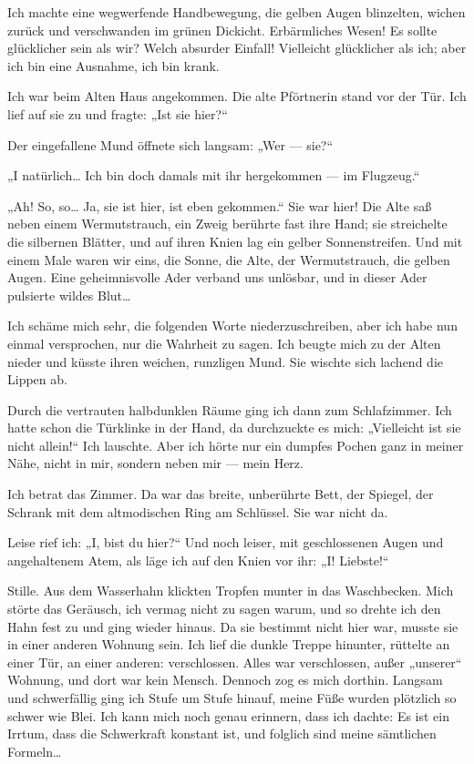 Ich machte eine wegwerfende Handbewegung, die gelben Augen
blinzelten, wichen zurück und verschwanden im grünen Dickicht.
Erbärmliches Wesen! Es sollte glücklicher sein als wir? Welch
absurder Einfall! Vielleicht glücklicher als ich; aber ich bin eine
Ausnahme, ich bin krank.

Ich war beim Alten Haus angekommen. Die
alte Pförtnerin stand vor der Tür. Ich lief auf sie zu und fragte:
%
„Ist sie hier?“

Der eingefallene Mund öffnete sich langsam: „Wer — sie?“

„I natürlich\ldots{} Ich bin doch damals mit ihr hergekommen — im
Flugzeug.“

„Ah! So, so\ldots{} Ja, sie ist hier, ist eben gekommen.“ Sie war hier!
Die Alte saß neben einem Wermutstrauch, ein Zweig berührte fast
ihre Hand; sie streichelte die silbernen Blätter, und auf ihren
Knien lag ein gelber Sonnenstreifen. Und mit einem Male waren wir
eins, die Sonne, die Alte, der Wermutstrauch, die gelben Augen.
Eine geheimnisvolle Ader verband uns unlösbar, und in dieser Ader
pulsierte wildes Blut\ldots{}

Ich schäme mich sehr, die folgenden Worte niederzuschreiben, aber
ich habe nun einmal versprochen, nur die Wahrheit zu sagen. Ich
beugte mich zu der Alten nieder und küsste ihren weichen, runzligen
Mund. Sie wischte sich lachend die Lippen ab.

Durch die vertrauten halbdunklen Räume ging ich dann zum
Schlafzimmer. Ich hatte schon die Türklinke in der Hand, da
durchzuckte es mich: „Vielleicht ist sie nicht allein!“ Ich
lauschte. Aber ich hörte nur ein dumpfes Pochen ganz in meiner
Nähe, nicht in mir, sondern neben mir — mein Herz.

Ich betrat das Zimmer. Da war das breite, unberührte Bett, der
Spiegel, der Schrank mit dem altmodischen Ring am Schlüssel. Sie
war nicht da.

Leise rief ich: „I, bist du hier?“ Und noch leiser, mit
geschlossenen Augen und angehaltenem Atem, als läge ich auf den
Knien vor ihr: „I! Liebste!“

Stille. Aus dem Wasserhahn klickten Tropfen munter in das
Waschbecken. Mich störte das Geräusch, ich vermag nicht zu sagen
warum, und so drehte ich den Hahn fest zu und ging wieder hinaus.
Da sie bestimmt nicht hier war, musste sie in einer anderen Wohnung
sein. Ich lief die dunkle Treppe hinunter, rüttelte an einer Tür,
an einer anderen: verschlossen. Alles war verschlossen, außer
„unserer“ Wohnung, und dort war kein Mensch. Dennoch zog es mich
dorthin. Langsam und schwerfällig ging ich Stufe um Stufe hinauf,
meine Füße wurden plötzlich so schwer wie Blei. Ich kann mich noch
genau erinnern, dass ich dachte: Es ist ein Irrtum, dass die
Schwerkraft konstant ist, und folglich sind meine sämtlichen
Formeln\ldots{}

